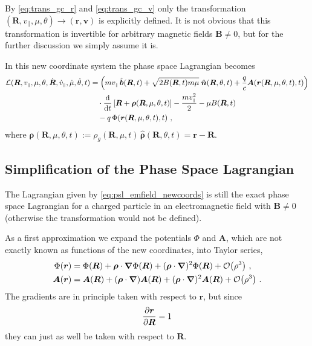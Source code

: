 \documentclass{scrartcl}
\renewcommand{\vec}[1]{\boldsymbol{#1}}
\newcommand{\uv}[1]{\hat{\vec{#1}}}
\newcommand{\bnabla}{\vec{\nabla}}
\newcommand{\rv}{\vec{r}}
\newcommand{\rvgc}{\vec{R}} %
\newcommand{\PSL}{\mathcal{L}}
\newcommand{\subparallel}{{\scriptscriptstyle\parallel}}
\begin{document}
By \eqref{eq:trans_gc_r} and \eqref{eq:trans_gc_v} only the transformation $(\rvgc,v_\subparallel,\mu,\theta) \rightarrow (\rv, \vec{v})$ is explicitly defined. It is not obvious that this transformation is invertible for arbitrary magnetic fields $\vec{B} \neq 0$, but for the further discussion we simply assume it is.

In this new coordinate system the phase space Lagrangian becomes
\begin{align}
\PSL(\rvgc,v_\subparallel,\mu,\theta,\dot{\rvgc},\dot{v}_\subparallel,\dot{\mu},\dot{\theta},t) &= \left(mv_{\scriptscriptstyle\subparallel}\,\uv{b}(\rvgc,t) + \sqrt{2B(\rvgc,t)m\mu}\;\uv{n}(\rvgc,\theta,t) + \frac{q}{c}\vec{A}(\rv(\rvgc,\mu,\theta,t),t)\right) \nonumber\\
&\quad\cdot\dv{t}\left[\rvgc + \vec{\rho}(\rvgc,\mu,\theta,t)\right] - \frac{m v_\subparallel^2}{2} - \mu B(\rvgc,t) \nonumber\\
&\quad  - q\,\Phi(\rv(\rvgc,\mu,\theta,t),t) \ , \label{eq:psl_emfield_newcoords}
\end{align}
where $\vec{\rho}(\rvgc,\mu,\theta,t) := \rho_g(\rvgc,\mu,t)\,\uv{\rho}(\rvgc,\theta,t) = \rv-\rvgc$.


\subsection{Simplification of the Phase Space Lagrangian}
The Lagrangian given by \eqref{eq:psl_emfield_newcoords} is still the exact phase space Lagrangian for a charged particle in an electromagnetic field with $\vec{B} \neq 0$ (otherwise the transformation would not be defined). 

As a first approximation we expand the potentials $\Phi$ and $\vec{A}$, which are not exactly known as functions of the new coordinates, into Taylor series,
\begin{align*}
\Phi(\rv) &= \Phi(\rvgc) + \vec{\rho}\cdot\bnabla\Phi(\rvgc) + (\vec{\rho}\cdot\bnabla)^2\Phi(\rvgc)  + \order{\rho^3} \ , \\
\vec{A}(\rv) &= \vec{A}(\rvgc) + (\vec{\rho}\cdot\bnabla)\vec{A}(\rvgc) + (\vec{\rho}\cdot\bnabla)^2\vec{A}(\rvgc) + \order{\rho^3} \ .
\end{align*}
The gradients are in principle taken with respect to $\rv$, but since
\begin{equation*}
\pdv{\rv}{\rvgc} = 1
\end{equation*}
they can just as well be taken with respect to $\rvgc$.
\end{document}
